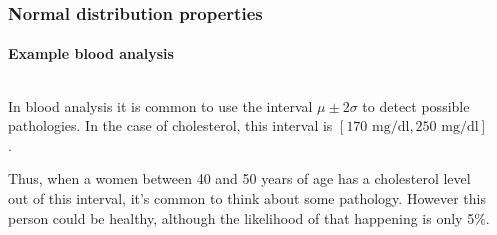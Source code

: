 \begin{frame}
\frametitle{Normal distribution properties}
\framesubtitle{Example blood analysis}
\begin{columns}
\begin{column}{0.47\textwidth}
In blood analysis it is common to use the interval $\mu\pm 2\sigma$ to detect possible pathologies.
In the case of cholesterol, this interval is $[170\text{ mg/dl}, 250\text{ mg/dl}]$. 

Thus, when a women between 40 and 50 years of age has a cholesterol level out of this interval, it's common to think about some pathology.
However this person could be healthy, although the likelihood of that happening is only 5\%.
\end{column}
\begin{column}{0.47\textwidth}
\begin{center}
\end{center}
\end{column}
\end{columns}
\end{frame}


